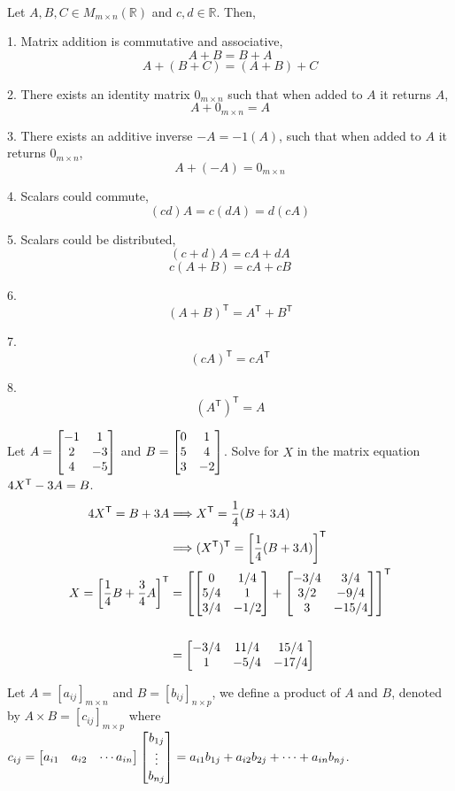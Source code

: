\begin{theorem}
\leavevmode \\
Let $A, B, C \in M_{m \times n}(\mathbb{R})$ and $c, d \in \mathbb{R}$. Then,

1. Matrix addition is commutative and associative,
$$A + B = B + A$$
$$A + (B + C) = (A + B) + C$$

2. There exists an identity matrix $0_{m \times n}$ such that when added to $A$ it returns $A$,
$$A + 0_{m \times n} = A$$

3. There exists an additive inverse $-A = -1(A)$, such that when added to $A$ it returns $0_{m \times n}$,
$$A + (-A) = 0_{m \times n}$$

4. Scalars could commute,
$$(cd)A = c(dA) = d(cA)$$

5. Scalars could be distributed,
$$(c + d)A = cA + dA$$
$$c(A + B) = cA + cB$$

6. $$(A + B)^{\mathsf{T}} = A^{\mathsf{T}} + B^{\mathsf{T}}$$

7. $$(cA)^{\mathsf{T}} = cA^{\mathsf{T}}$$

8. $$(A^{\mathsf{T}})^{\mathsf{T}} = A$$
\end{theorem}

\begin{example}
Let $A = \begin{bmatrix} -1 & 1 \\ 2 & -3 \\ 4 & -5 \end{bmatrix}$ and $B = \begin{bmatrix} 0 & 1 \\ 5 & 4 \\ 3 & -2 \end{bmatrix}$. Solve for $X$ in the matrix equation $4X^{\mathsf{T}} - 3A = B$.
\begin{align*}
4X^{\mathsf{T}} = B + 3A &\Longrightarrow X^{\mathsf{T}} = \frac{1}{4}(B + 3A) \\
&\Longrightarrow (X^{\mathsf{T}})^{\mathsf{T}} = \left[\frac{1}{4}(B + 3A)\right]^{\mathsf{T}} \\
X = \left[\frac{1}{4}B + \frac{3}{4}A\right]^{\mathsf{T}} &= \left[\begin{bmatrix} 0 & 1/4 \\ 5/4 & 1 \\ 3/4 & -1/2 \end{bmatrix} + \begin{bmatrix} -3/4 & 3/4 \\ 3/2 & -9/4 \\ 3 & -15/4 \end{bmatrix}\right]^{\mathsf{T}} \\\\
&=\begin{bmatrix} -3/4 & 11/4 & 15/4 \\ 1 & -5/4 & -17/4 \end{bmatrix}
\end{align*}
\end{example}


\begin{definition}
Let $A = [a_{ij}]_{m \times n}$ and $B = [b_{ij}]_{n \times p}$, we define a product of $A$ and $B$, denoted by $A \times B = [c_{ij}]_{m \times p}$  where $\displaystyle c_{ij} = \begin{bmatrix} a_{i1} & a_{i2} & \cdots a_{in} \end{bmatrix} \begin{bmatrix} b_{1j} \\ \vdots \\ b_{nj} \end{bmatrix} = a_{i1}b_{1j} + a_{i2}b_{2j} + \cdots + a_{in}b_{nj}$.
\end{definition}

